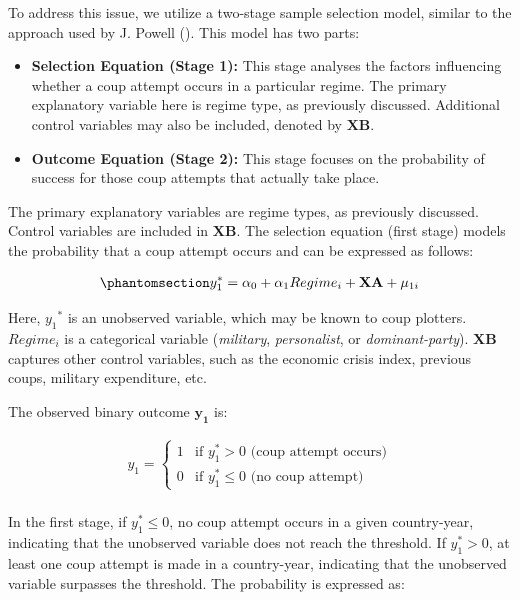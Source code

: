 \documentclass[
  12pt,
]{report}
\begin{document}
To address this issue, we utilize a two-stage sample selection model,
similar to the approach used by J. Powell
(). This model has two parts:

\begin{itemize}
\item
  \textbf{Selection Equation (Stage 1):} This stage analyses the factors
  influencing whether a coup attempt occurs in a particular regime. The
  primary explanatory variable here is regime type, as previously
  discussed. Additional control variables may also be included, denoted
  by \(\mathbf{XB}\).
\item
  \textbf{Outcome Equation (Stage 2):} This stage focuses on the
  probability of success for those coup attempts that actually take
  place.
\end{itemize}

The primary explanatory variables are regime types, as previously
discussed. Control variables are included in \(\mathbf{XB}\). The
selection equation (first stage) models the probability that a coup
attempt occurs and can be expressed as follows:

\begin{equation}\phantomsection\label{eq-eq4}{
\begin{aligned}
y_1^*=\alpha_0 + \alpha_1 Regime_i + \mathbf {XA} + \mu_{1i}
\end{aligned}
}\end{equation}

Here, \({y_1}^*\) is an unobserved variable, which may be known to coup
plotters. \(Regime_i\) is a categorical variable (\emph{military},
\emph{personalist}, or \emph{dominant-party}). \(\mathbf{XB}\) captures
other control variables, such as the economic crisis index, previous
coups, military expenditure, etc.

The observed binary outcome \(\mathbf{y_1}\) is:

\[
\begin{aligned}
y_1 = 
\begin{cases} 
1 &\text{if $y_1^*>0$ (coup attempt occurs)} \\
0 &\text{if $y_1^*\le0$ (no coup attempt)}
\end{cases}
\end{aligned}
\]\\
In the first stage, if \(y_1^*\le0\), no coup attempt occurs in a given
country-year, indicating that the unobserved variable does not reach the
threshold. If \(y_1^*>0\), at least one coup attempt is made in a
country-year, indicating that the unobserved variable surpasses the
threshold. The probability is expressed as:
\end{document}
